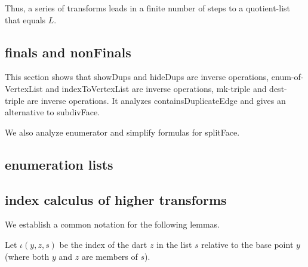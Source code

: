
Thus, a series of transforms leads in a finite number of steps to a quotient-list that equals $L$.

\subsection{finals and nonFinals}

This section shows that showDups and hideDups are inverse operations, enum-of-VertexList and indexToVertexList are inverse
operations, mk-triple and dest-triple are inverse operations.  It analyzes containsDuplicateEdge and gives
an alternative to subdivFace.

We also analyze enumerator and simplify formulas for splitFace.

\subsection{enumeration lists}



\subsection{index calculus of higher transforms}

We establish a common notation for the following lemmas.

Let $\iota(y,z,s)$ be the index of the dart $z$ in the list $s$ relative
to the base point $y$ (where both $y$ and $z$ are members of $s$).

